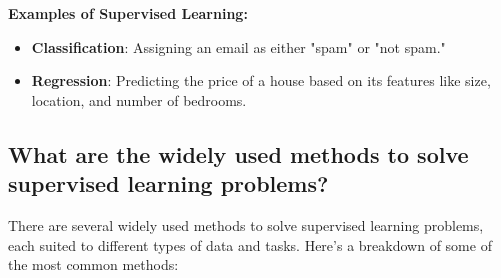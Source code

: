 \textbf{Examples of Supervised Learning:}
\begin{itemize}
    \item \textbf{Classification}: Assigning an email as either "spam" or "not spam."
    \item \textbf{Regression}: Predicting the price of a house based on its features like size, location, and number of bedrooms.
\end{itemize}

\subsection{What are the widely used methods to solve supervised learning problems?}
There are several widely used methods to solve supervised learning problems, each suited to different types of data and tasks. Here’s a breakdown of some of the most common methods:

